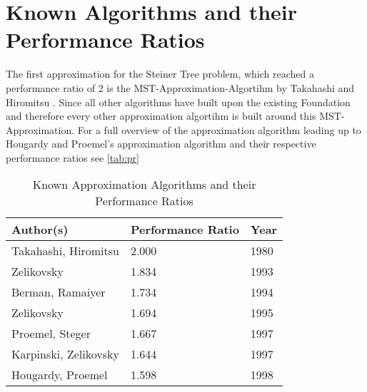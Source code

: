 \section{Known Algorithms and their Performance Ratios}
The first approximation for the Steiner Tree problem, which reached a performance ratio of 2 is the MST-Approximation-Algortihm by Takahashi and Hiromitsu \cite{takahashi1980approximate}. Since all other algorithms have built upon the existing Foundation and therefore every other approximation algortihm is built around this MST-Approximation. 
For a full overview of the approximation algorithm leading up to Hougardy and Proemel's approximation algorithm and their respective performance ratios see \autoref{tab:pr}
\begin{table}[htbp]
  \caption[Known Perfomance Ratios]{Known Approximation Algorithms and their Performance Ratios \cite{HoPr99}}\label{tab:pr}
  \centering
  \begin{tabular}{l l l}
    \toprule
      Author(s) & Performance Ratio & Year \\
    \midrule
      Takahashi, Hiromitsu & 2.000 & 1980 \\
      Zelikovsky & 1.834 & 1993 \\
      Berman, Ramaiyer & 1.734 & 1994 \\
      Zelikovsky & 1.694 & 1995 \\
      Proemel, Steger & 1.667 & 1997 \\
      Karpinski, Zelikovsky & 1.644 & 1997 \\
      Hougardy, Proemel & 1.598 & 1998 \\    
\bottomrule
  \end{tabular}
\end{table}
